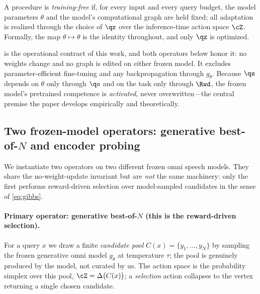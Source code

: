 \begin{definition}
\label{def:invariant}
A procedure is \emph{training-free} if, for every input and every query budget, the model parameters $\theta$ and the model's computational graph are held fixed; all adaptation is realized through the choice of $\qz$ over the inference-time action space $\cZ$. Formally, the map $\theta \mapsto \theta$ is the identity throughout, and only $\qz$ is optimized.
\end{definition}

 is the operational contract of this work, and both operators below honor it: no weights change and no graph is edited on either frozen model. It excludes parameter-efficient fine-tuning and any backpropagation through $g_\theta$. Because $\qs$ depends on $\theta$ only through $\qo$ and on the task only through $\Rwd$, the frozen model's pretrained competence is \emph{activated}, never overwritten---the central premise the paper develops empirically and theoretically.

\subsection{Two frozen-model operators: generative best-of-$N$ and encoder probing}
\label{subsec:operator}

We instantiate two operators on two different frozen omni speech models. They share the no-weight-update invariant but are \emph{not} the same machinery: only the first performs reward-driven selection over model-sampled candidates in the sense of \eqref{eq:gibbs}.

\paragraph{Primary operator: generative best-of-$N$ (this is the reward-driven selection).}
For a query $x$ we draw a finite \emph{candidate pool} $C(x)=\{y_1,\dots,y_N\}$ by sampling the frozen generative omni model $g_\theta$ at temperature $\tau$; the pool is genuinely produced by the model, not curated by us. The action space is the probability simplex over this pool, $\cZ = \Delta\big(C(x)\big)$; a \emph{selection} action collapses to the vertex returning a single chosen candidate.

